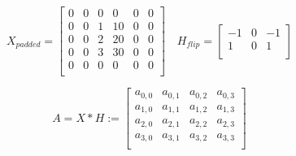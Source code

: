 \documentclass[11pt]{article}
\theoremstyle{plain}
\begin{document}
\[
	X_{padded} =
	\begin{bmatrix}
		0 & 0 & 0 & 0  & 0 & 0 \\
		0 & 0 & 1 & 10 & 0 & 0 \\
		0 & 0 & 2 & 20 & 0 & 0 \\
		0 & 0 & 3 & 30 & 0 & 0 \\
		0 & 0 & 0 & 0  & 0 & 0 \\
	\end{bmatrix} \quad
	H_{flip} =
	\begin{bmatrix}
		-1 & 0 & -1 \\
		1  & 0 & 1  \\
	\end{bmatrix}
\]

\vspace{1em}
\[
	A = X \ast H :=
	\begin{bmatrix}
		a_{0,0} & a_{0,1} & a_{0,2} & a_{0,3} \\
		a_{1,0} & a_{1,1} & a_{1,2} & a_{1,3} \\
		a_{2,0} & a_{2,1} & a_{2,2} & a_{2,3} \\
		a_{3,0} & a_{3,1} & a_{3,2} & a_{3,3} \\
	\end{bmatrix}
\]
\vspace{1em}
\end{document}

